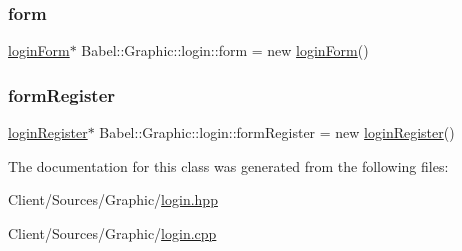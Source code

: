 \subsubsection{\texorpdfstring{form}{form}}
{\footnotesize\ttfamily \hyperlink{classBabel_1_1Graphic_1_1loginForm}{login\+Form}$\ast$ Babel\+::\+Graphic\+::login\+::form = new \hyperlink{classBabel_1_1Graphic_1_1loginForm}{login\+Form}()}

\mbox{\label{classBabel_1_1Graphic_1_1login_a3dba6799011fb1d05dad52a689e72534}} 
\subsubsection{\texorpdfstring{form\+Register}{formRegister}}
{\footnotesize\ttfamily \hyperlink{classBabel_1_1Graphic_1_1loginRegister}{login\+Register}$\ast$ Babel\+::\+Graphic\+::login\+::form\+Register = new \hyperlink{classBabel_1_1Graphic_1_1loginRegister}{login\+Register}()}



The documentation for this class was generated from the following files\+:\begin{DoxyCompactItemize}
\item 
Client/\+Sources/\+Graphic/\hyperlink{login_8hpp}{login.\+hpp}\item 
Client/\+Sources/\+Graphic/\hyperlink{login_8cpp}{login.\+cpp}\end{DoxyCompactItemize}
